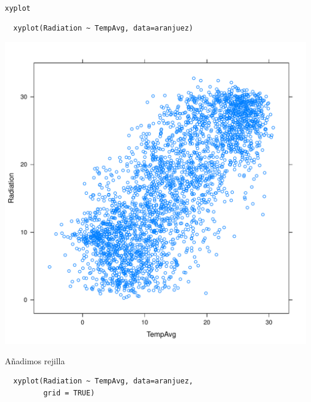 \documentclass[xcolor={usenames,svgnames,dvipsnames}]{beamer}
\begin{document}
\begin{frame}[fragile,label=sec-2-1-2]{\texttt{xyplot}}
 \lstset{language=R,label= ,caption= ,numbers=none}
\begin{lstlisting}
  xyplot(Radiation ~ TempAvg, data=aranjuez)
\end{lstlisting}
\end{frame}

\begin{frame}[label=sec-2-1-3]{}
\includegraphics[width=.9\linewidth]{figs/xyplot.pdf}
\end{frame}


\begin{frame}[fragile,label=sec-2-1-4]{Añadimos rejilla}
 \lstset{language=R,label= ,caption= ,numbers=none}
\begin{lstlisting}
  xyplot(Radiation ~ TempAvg, data=aranjuez,
         grid = TRUE)
\end{lstlisting}
\end{frame}
\end{document}
